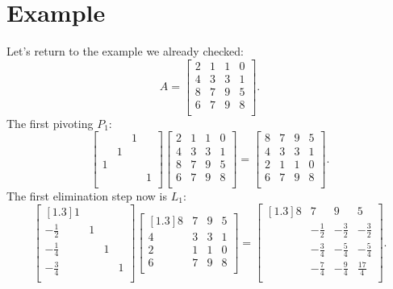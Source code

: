 \section{Example}
Let's return to the example we already checked: 
\[
    A = \begin{bmatrix}
        2 & 1 & 1 &  0 \\
        4 & 3 & 3 &  1 \\
        8 & 7 & 9 &  5 \\
        6 & 7 & 9 &  8 \\
    \end{bmatrix}.  
\]
The first pivoting $P_1$: 
\[
    \begin{bmatrix}
         &  & 1 &   \\
         & 1 &  &   \\
        1 &  &  &   \\
         &  &  &  1 \\
    \end{bmatrix} 
    \begin{bmatrix}
        2 & 1 & 1 &  0 \\
        4 & 3 & 3 &  1 \\
        8 & 7 & 9 &  5 \\
        6 & 7 & 9 &  8 \\
    \end{bmatrix}
    = 
    \begin{bmatrix}
        8 & 7 & 9 &  5 \\
        4 & 3 & 3 &  1 \\
        2 & 1 & 1 &  0 \\
        6 & 7 & 9 &  8 \\
    \end{bmatrix}. 
\]
The first elimination step now is $L_1$: 
\[
    \begin{bmatrix}[1.3]
        1 &  &  &   \\
        -\frac{1}{2} & 1 &  &   \\
        -\frac{1}{4} &  &1   &   \\
         -\frac{3}{4} &  &  &1   \\
    \end{bmatrix} 
    \begin{bmatrix}[1.3]
        8 & 7 & 9 &  5 \\
        4 & 3 & 3 &  1 \\
        2 & 1 & 1 &  0 \\
        6 & 7 & 9 &  8 \\
    \end{bmatrix} 
    = 
    \begin{bmatrix}[1.3]
        8 & 7 & 9 &  5 \\
         & -\frac{1}{2} & -\frac{3}{2} &  -\frac{3}{2} \\
         & -\frac{3}{4} & -\frac{5}{4} &  -\frac{5}{4} \\
         & -\frac{7}{4} & -\frac{9}{4} &  \frac{17}{4} \\
    \end{bmatrix}.  
\]
